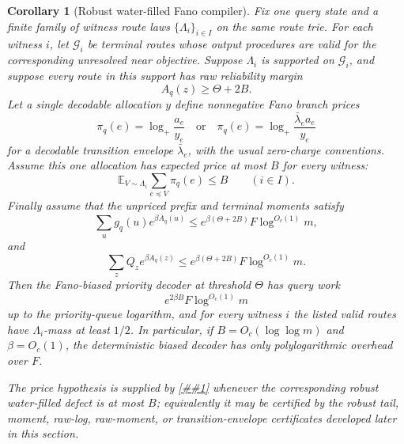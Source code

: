 \documentclass[10pt]{article}
\newcommand{\cref}[1]{\ref{##1}}
\newtheorem{corollary}[theorem]{Corollary}
\theoremstyle{definition}
\newcommand{\E}{\mathbb{E}}
\begin{document}
\begin{corollary}[Robust water-filled Fano compiler]
   \label{cor:robust-fano-allocation-compiler}
   Fix one query state and a finite family of witness route laws
   \(\{\Lambda_i\}_{i\in I}\) on the same route trie.  For each witness
   \(i\), let \(\mathcal G_i\) be terminal routes whose output procedures are
   valid for the corresponding unresolved near objective.  Suppose
   \(\Lambda_i\) is supported on \(\mathcal G_i\), and suppose every route in
   this support has raw reliability margin
   \[
      A_q(z)\ge\Theta+2B .
   \]
   Let a single decodable allocation \(y\) define nonnegative Fano branch
   prices
   \[
      \pi_q(e)=\log_+\frac{a_e}{y_e}
      \quad\text{or}\quad
      \pi_q(e)=\log_+\frac{\bar\lambda_ea_e}{y_e}
   \]
   for a decodable transition envelope \(\bar\lambda_e\), with the usual
   zero-charge conventions.  Assume this one allocation has expected price at
   most \(B\) for every witness:
   \[
      \E_{V\sim\Lambda_i}\sum_{e\preceq V}\pi_q(e)\le B
      \qquad(i\in I).
   \]
   Finally assume that the unpriced prefix and terminal moments satisfy
   \[
      \sum_u g_q(u)e^{\beta\overline A_q(u)}
      \le
      e^{\beta(\Theta+2B)}F\log^{O_c(1)}m,
   \]
   and
   \[
      \sum_z Q_z e^{\beta A_q(z)}
      \le
      e^{\beta(\Theta+2B)}F\log^{O_c(1)}m.
   \]
   Then the Fano-biased priority decoder at threshold \(\Theta\) has query work
   \[
      e^{2\beta B}F\log^{O_c(1)}m
   \]
   up to the priority-queue logarithm, and for every witness \(i\) the listed
   valid routes have \(\Lambda_i\)-mass at least \(1/2\).  In particular, if
   \(B=O_c(\log\log m)\) and \(\beta=O_c(1)\), the deterministic biased
   decoder has only polylogarithmic overhead over \(F\).

   The price hypothesis is supplied by
   \cref{lem:robust-waterfilled-minimax} whenever the corresponding robust
   water-filled defect is at most \(B\); equivalently it may be certified by
   the robust tail, moment, raw-log, raw-moment, or transition-envelope
   certificates developed later in this section.
\end{corollary}
\end{document}
